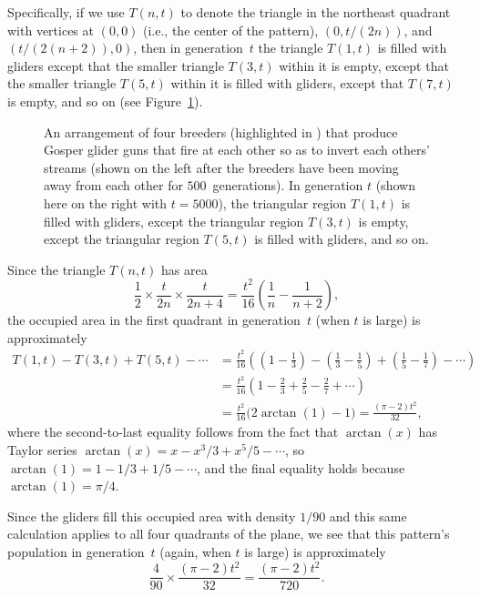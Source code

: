 \begin{itemize}
	Specifically, if we use $T(n,t)$ to denote the triangle in the northeast quadrant with vertices at $(0,0)$ (i.e., the center of the pattern), $(0, t/(2n))$, and $(t/(2(n+2)), 0)$, then in generation~$t$ the triangle $T(1,t)$ is filled with gliders except that the smaller triangle $T(3,t)$ within it is empty, except that the smaller triangle $T(5,t)$ within it is filled with gliders, except that $T(7,t)$ is empty, and so on (see Figure~\ref{fig:life_computes_pi}).\bigskip
	
	\begin{figure}[!htb]
		\centering
		\caption{An arrangement of four breeders (highlighted in ) that produce Gosper glider guns that fire at each other so as to invert each others' streams (shown on the left after the breeders have been moving away from each other for $500$~generations). In generation $t$ (shown here on the right with $t = 5000$), the  triangular region $T(1,t)$ is filled with gliders, except the  triangular region $T(3,t)$ is empty, except the  triangular region $T(5,t)$ is filled with gliders, and so on.}\label{fig:life_computes_pi}
	\end{figure}
	
	Since the triangle $T(n,t)$ has area
	\[
		\frac{1}{2} \times \frac{t}{2n} \times \frac{t}{2n+4} = \frac{t^2}{16} \left(\frac{1}{n} - \frac{1}{n+2}\right),
	\]
	the occupied area in the first quadrant in generation~$t$ (when $t$ is large) is approximately
	\begin{align*}
		T(1,t) - T(3,t) + T(5,t) - \cdots & = \frac{t^2}{16} \left( \left(1 - \frac{1}{3}\right) - \left(\frac{1}{3} - \frac{1}{5}\right) + \left(\frac{1}{5} - \frac{1}{7}\right) - \cdots\right) \\
		& = \frac{t^2}{16} \left( 1 - \frac{2}{3} + \frac{2}{5} - \frac{2}{7} + \cdots\right) \\
		& = \frac{t^2}{16}\big( 2\arctan(1) - 1\big) = \frac{(\pi-2)t^2}{32},
	\end{align*}
	where the second-to-last equality follows from the fact that $\arctan(x)$ has Taylor series $\arctan(x) = x - x^3/3 + x^5/5 - \cdots$, so $\arctan(1) = 1 - 1/3 + 1/5 - \cdots$, and the final equality holds because $\arctan(1) = \pi/4$.
	
	Since the gliders fill this occupied area with density $1/90$ and this same calculation applies to all four quadrants of the plane, we see that this pattern's population in generation~$t$ (again, when $t$ is large) is approximately
	\[
		\frac{4}{90} \times \frac{(\pi-2)t^2}{32} = \frac{(\pi-2)t^2}{720}.
	\]
\end{itemize}

